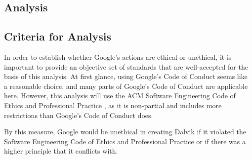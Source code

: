 \documentclass[11pt]{article}
\begin{document}
\begin{multicols}{2}


\section{Analysis} %
\label{sec:analysis}

%
%
%
%

\subsection{Criteria for Analysis} %
\label{sub:criteria}

In order to establish whether Google's actions are ethical or unethical, it is
important to provide an objective set of standards that are well-accepted for
the basis of this analysis.  At first glance, using Google's Code of Conduct
\cite{google-conduct} seems like a reasonable choice, and many parts of Google's
Code of Conduct are applicable here.  However, this analysis will use the ACM
Software Engineering Code of Ethics and Professional Practice \cite{secode}, as
it is non-partial and includes more restrictions than Google's Code of Conduct
does.

By this measure, Google would be unethical in creating Dalvik if it violated the
Software Engineering Code of Ethics and Professional Practice \cite{secode} or
if there was a higher principle that it conflicts with.


\end{multicols}
\end{document}
